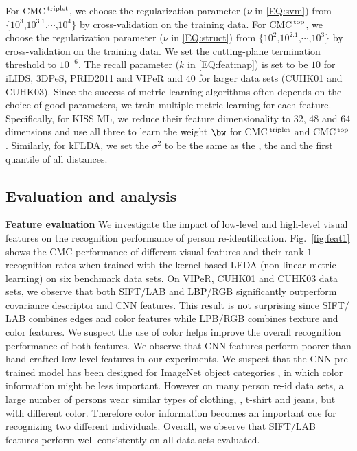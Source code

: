 \documentclass[10pt,twocolumn,letterpaper]{article}
\def\CMCstruct{{\rm CMC$^{\,\rm top}$}\xspace}
\def\CMCtriplet{{\rm CMC$^{\,\rm triplet}$}\xspace}
\renewcommand{\paragraph}{\textbf}
\begin{document}
For \CMCtriplet, we
choose the regularization parameter
($\nu$ in \eqref{EQ:svm}) from
$\{10^{3}$,$10^{3.1}$,$\cdots$,$10^{4}\}$ by cross-validation
on the training data.
%
%
%
%
%
%
%
For \CMCstruct, we choose the
regularization parameter ($\nu$ in \eqref{EQ:struct})
from $\{10^{2}$,$10^{2.1}$,$\cdots$,$10^{3}\}$ by cross-validation
on the training data.
We set the cutting-plane termination threshold to $10^{-6}$.
The recall parameter ($k$ in \eqref{EQ:featmap}) is set
to be $10$ for iLIDS, 3DPeS, PRID2011
and VIPeR and $40$ for larger data sets (CUHK01 and CUHK03).
Since the success of metric learning algorithms often depends on the choice
of good parameters, we train multiple metric learning for each feature.
Specifically, for KISS ML, we reduce their feature dimensionality
to $32$, $48$ and $64$ dimensions and use all three to learn
the weight $\bw$ for \CMCtriplet and \CMCstruct.
Similarly, for kFLDA, we set the
$\sigma^2$ to be the same as the , the
 and the first quantile of all distances.






%
\subsection{Evaluation and analysis}
%
%
\paragraph{Feature evaluation}
%
We investigate the impact of low-level and high-level
visual features on the recognition performance of
person re-identification.
Fig.~\ref{fig:feat1} shows the CMC performance of different
visual features and their rank-$1$ recognition rates
when trained with the
kernel-based LFDA
(non-linear metric learning) on six benchmark
data sets.
On VIPeR, CUHK01 and CUHK03 data sets,
we observe that both SIFT$/$LAB and LBP$/$RGB
significantly outperform
covariance descriptor and CNN features.
This result is not surprising since
SIFT$/$LAB combines edges and color features
while LPB$/$RGB combines texture and color features.
We suspect the use of color
helps improve the overall recognition performance
of both features.
We observe that CNN features perform poorer than
hand-crafted low-level features in our experiments.
We suspect that the CNN pre-trained model
has been designed for ImageNet object categories
\cite{Krizhevsky2012Imagenet},
in which color information might be less important.
However on many person re-id data sets,
a large number of persons wear similar types
of clothing, \eg, t-shirt and jeans,
but with different color.
Therefore color information becomes an important cue for recognizing two
different individuals.
Overall, we observe that SIFT$/$LAB features perform
well consistently on all data sets evaluated.
\end{document}
